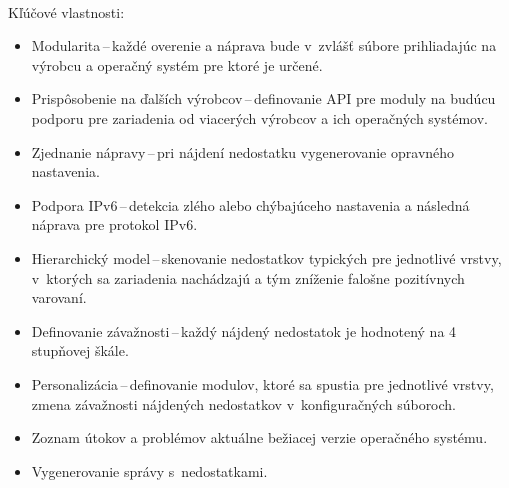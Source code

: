 \newpage
\noindent
\\
Kľúčové vlastnosti:

\begin{itemize}
	\item Modularita\,--\,každé overenie a náprava bude v~zvlášť súbore prihliadajúc na výrobcu a operačný systém pre ktoré je určené.
	\vspace{0.5em}
	\item Prispôsobenie na ďalších výrobcov\,--\,definovanie API pre moduly na budúcu podporu pre zariadenia od viacerých výrobcov a ich operačných systémov.
	\vspace{0.5em}
	\item Zjednanie nápravy\,--\,pri nájdení nedostatku vygenerovanie opravného nastavenia.
	\vspace{0.5em}
	\item Podpora IPv6\,--\,detekcia zlého alebo chýbajúceho nastavenia a následná náprava pre protokol IPv6.
	\vspace{0.5em}
	\item Hierarchický model\,--\,skenovanie nedostatkov typických pre jednotlivé vrstvy, v~ktorých sa zariadenia nachádzajú a tým zníženie falošne pozitívnych varovaní.\vspace{0.5em}
	\item Definovanie závažnosti\,--\,každý nájdený nedostatok je hodnotený na 4 stupňovej škále.
	\vspace{0.5em}
	\item Personalizácia\,--\,definovanie modulov, ktoré sa spustia pre jednotlivé vrstvy, zmena závažnosti nájdených nedostatkov v~konfiguračných súboroch.
	\vspace{0.5em}
	\item Zoznam útokov a problémov aktuálne bežiacej verzie operačného systému.
	\vspace{0.5em}
	\item Vygenerovanie správy s~nedostatkami.
\end{itemize}

\newpage
